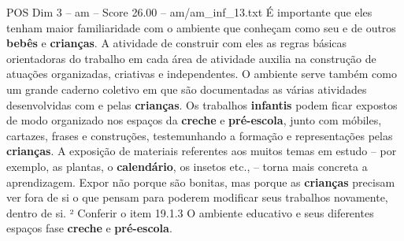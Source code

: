 \begin{textsample}{POS Dim 3 – am – Score 26.00 – am/am\_inf\_13.txt}
É importante que eles tenham maior familiaridade com o ambiente que conheçam como seu e de outros \textbf{bebês} e \textbf{crianças}.
A atividade de construir com eles as regras básicas orientadoras do trabalho em cada área de atividade auxilia na construção de atuações organizadas, criativas e independentes.
O ambiente serve também como um grande caderno coletivo em que são documentadas as várias atividades desenvolvidas com e pelas \textbf{crianças}.
Os trabalhos \textbf{infantis} podem ficar expostos de modo organizado nos espaços da \textbf{creche} e \textbf{pré-escola}, junto com móbiles, cartazes, frases e construções, testemunhando a formação e representações pelas \textbf{crianças}.
A exposição de materiais referentes aos muitos temas em estudo – por exemplo, as plantas, o \textbf{calendário}, os insetos etc., – torna mais concreta a aprendizagem.
Expor não porque são bonitas, mas porque as \textbf{crianças} precisam ver fora de si o que pensam para poderem modificar seus trabalhos novamente, dentro de si. ² Conferir o item 19.1.3 O ambiente educativo e seus diferentes espaços fase \textbf{creche} e \textbf{pré-escola}.

\end{textsample}
